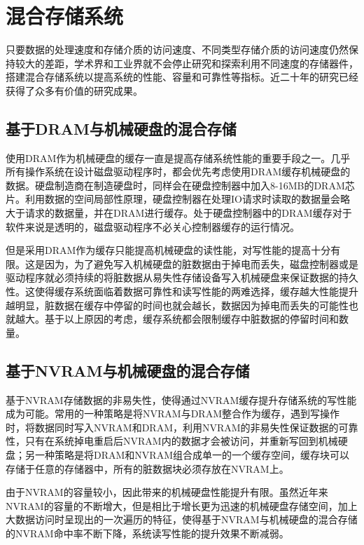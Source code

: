 \section{混合存储系统}
\label{sec:hybrid_storage}

只要数据的处理速度和存储介质的访问速度、不同类型存储介质的访问速度仍然保持较大的差距，学术界和工业界就不会停止研究和探索利用不同速度的存储器件，搭建混合存储系统\cite{zhuqing2013hybrid}以提高系统的性能、容量和可靠性等指标。近二十年的研究已经获得了众多有价值的研究成果。

\subsection{基于DRAM与机械硬盘的混合存储}

使用DRAM作为机械硬盘的缓存\cite{sdramcache2002}一直是提高存储系统性能的重要手段之一。几乎所有操作系统在设计磁盘驱动程序时，都会优先考虑使用DRAM缓存机械硬盘的数据。硬盘制造商在制造硬盘时，同样会在硬盘控制器中加入8-16MB的DRAM芯片。利用数据的空间局部性原理，硬盘控制器在处理IO请求时读取的数据量会略大于请求的数据量，并在DRAM进行缓存。处于硬盘控制器中的DRAM缓存对于软件来说是透明的，磁盘驱动程序不必关心控制器缓存的运行情况。

但是采用DRAM作为缓存只能提高机械硬盘的读性能，对写性能的提高十分有限。这是因为，为了避免写入机械硬盘的脏数据由于掉电而丢失，磁盘控制器或是驱动程序就必须持续的将脏数据从易失性存储设备写入机械硬盘来保证数据的持久性。这使得缓存系统面临着数据可靠性和读写性能的两难选择，缓存越大性能提升越明显，脏数据在缓存中停留的时间也就会越长，数据因为掉电而丢失的可能性也就越大。基于以上原因的考虑，缓存系统都会限制缓存中脏数据的停留时间和数量。

\subsection{基于NVRAM与机械硬盘的混合存储}

基于NVRAM存储数据的非易失性，使得通过NVRAM缓存提升存储系统的写性能成为可能。常用的一种策略是将NVRAM与DRAM整合作为缓存\cite{nvramcache2013}，遇到写操作时，将数据同时写入NVRAM和DRAM，利用NVRAM的非易失性保证数据的可靠性，只有在系统掉电重启后NVRAM内的数据才会被访问，并重新写回到机械硬盘；另一种策略是将DRAM和NVRAM组合成单一的一个缓存空间，缓存块可以存储于任意的存储器中，所有的脏数据块必须存放在NVRAM上。

由于NVRAM的容量较小，因此带来的机械硬盘性能提升有限。虽然近年来NVRAM的容量的不断增大，但是相比于增长更为迅速的机械硬盘存储空间，加上大数据访问时呈现出的一次遍历的特征，使得基于NVRAM与机械硬盘的混合存储的NVRAM命中率不断下降，系统读写性能的提升效果不断减弱。


